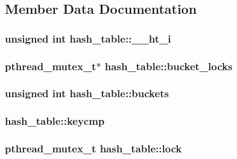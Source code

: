 \subsection{Member Data Documentation}
\hypertarget{structhash__table_a77da69e21124ac1097627ae23ae72ef5}{
\subsubsection[{\-\_\-\-\_\-ht\-\_\-i}]{\setlength{\rightskip}{0pt plus 5cm}unsigned int hash\-\_\-table\-::\-\_\-\-\_\-ht\-\_\-i}}\label{structhash__table_a77da69e21124ac1097627ae23ae72ef5}
\hypertarget{structhash__table_a75f86a63f6a0efb451750126133cdddc}{
\subsubsection[{bucket\-\_\-locks}]{\setlength{\rightskip}{0pt plus 5cm}pthread\-\_\-mutex\-\_\-t$\ast$ hash\-\_\-table\-::bucket\-\_\-locks}}\label{structhash__table_a75f86a63f6a0efb451750126133cdddc}
\hypertarget{structhash__table_a4678419b52c36e8b949b17eb4843a420}{
\subsubsection[{buckets}]{\setlength{\rightskip}{0pt plus 5cm}unsigned int hash\-\_\-table\-::buckets}}\label{structhash__table_a4678419b52c36e8b949b17eb4843a420}
\hypertarget{structhash__table_a9465a319f391f0a50a4a84362c40fe48}{
\subsubsection[{keycmp}]{ hash\-\_\-table\-::keycmp}}\label{structhash__table_a9465a319f391f0a50a4a84362c40fe48}
\hypertarget{structhash__table_af4cefababf047c699eca5f45f8d4284e}{
\subsubsection[{lock}]{\setlength{\rightskip}{0pt plus 5cm}pthread\-\_\-mutex\-\_\-t hash\-\_\-table\-::lock}}\label{structhash__table_af4cefababf047c699eca5f45f8d4284e}
